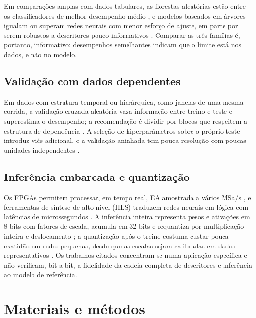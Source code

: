 \documentclass[12pt]{article}
\begin{document}
Em comparações amplas com dados tabulares, as florestas aleatórias estão entre os classificadores de melhor desempenho médio \cite{fernandezdelgado2014}, e modelos baseados em árvores igualam ou superam redes neurais com menor esforço de ajuste, em parte por serem robustos a descritores pouco informativos \cite{grinsztajn2022,shwartzziv2022}. Comparar as três famílias é, portanto, informativo: desempenhos semelhantes indicam que o limite está nos dados, e não no modelo.

\subsection{Validação com dados dependentes}
\label{subsec:rev_validacao}

Em dados com estrutura temporal ou hierárquica, como janelas de uma mesma corrida, a validação cruzada aleatória vaza informação entre treino e teste e superestima o desempenho; a recomendação é dividir por blocos que respeitem a estrutura de dependência \cite{kaufman2012,roberts2017}. A seleção de hiperparâmetros sobre o próprio teste introduz viés adicional, e a validação aninhada tem pouca resolução com poucas unidades independentes \cite{varma2006}.

\subsection{Inferência embarcada e quantização}
\label{subsec:rev_embarcado}

Os FPGAs permitem processar, em tempo real, EA amostrada a vários MSa/s \cite{kang2015,wirtz2018}, e ferramentas de síntese de alto nível (HLS) traduzem redes neurais em lógica com latências de microssegundos \cite{duarte2018,amd_ug1399}. A inferência inteira representa pesos e ativações em 8 bits com fatores de escala, acumula em 32 bits e requantiza por multiplicação inteira e deslocamento \cite{jacob2018,krishnamoorthi2018}; a quantização após o treino costuma custar pouca exatidão em redes pequenas, desde que as escalas sejam calibradas em dados representativos \cite{nagel2021}. Os trabalhos citados concentram-se numa aplicação específica e não verificam, bit a bit, a fidelidade da cadeia completa de descritores e inferência ao modelo de referência.

\section{Materiais e métodos}
\label{sec:metodos}
\end{document}

